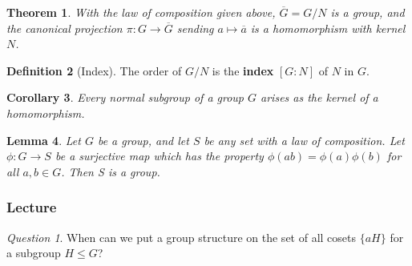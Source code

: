 \documentclass[12pt]{article}
\newtheorem{thm}{Theorem}[section]
\newtheorem{lem}[thm]{Lemma}  %
\newtheorem{cor}[thm]{Corollary}
\theoremstyle{definition}
\newtheorem{defn}[thm]{Definition}
\theoremstyle{remark}
\newtheorem*{qst}{Question}
\numberwithin{equation}{section}
\newcommand\B[1]{\textbf{ #1}}
\begin{document}
\begin{thm}
        With the law of composition given above, $\overline{G} = G/N$ is a group, and the canonical projection $\pi:G\rightarrow \overline{G}$ sending $a\mapsto \overline{a}$ is a homomorphism with kernel $N$.
\end{thm}

\vspace{15pt}

\begin{defn}[Index]
        The order of $G/N$ is the \B{index} $[G:N]$ of $N$ in $G$.
\end{defn}


\vspace{15pt}

\begin{cor}
        Every normal subgroup of a group $G$ arises as the kernel of a homomorphism.
\end{cor}


\vspace{15pt}


\begin{lem}
        Let $G$ be a group, and let $S$ be any set with a law of composition. Let $\phi:G \rightarrow S$ be a surjective map which has the property $\phi(ab) = \phi(a)\phi(b)$ for all $a,b \in G$. Then S is a group.
\end{lem}
\vspace{15pt}

\subsubsection{Lecture}
\begin{qst}
        When can we put a group structure on the set of all cosets $\{aH\}$ for a subgroup $H \leq G$?
\end{qst}
\end{document}
